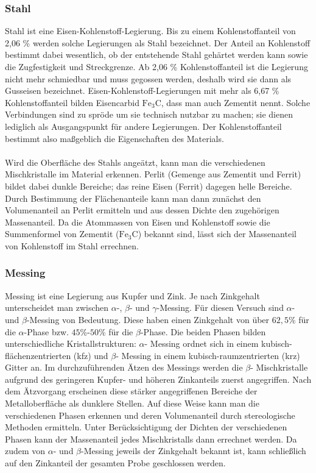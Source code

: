 \documentclass[german,  %
parskip=full,  %
]{scrartcl}
\begin{document}
\subsubsection{Stahl}
Stahl ist eine Eisen-Kohlenstoff-Legierung. Bis zu einem Kohlenstoffanteil von 2,06 \% werden solche Legierungen als Stahl bezeichnet. Der Anteil an Kohlenstoff bestimmt dabei wesentlich, ob der entstehende Stahl gehärtet werden kann sowie die Zugfestigkeit und Streckgrenze. Ab 2,06 \% Kohlenstoffanteil ist die Legierung nicht mehr schmiedbar und muss gegossen werden, deshalb wird sie dann als Gusseisen bezeichnet. Eisen-Kohlenstoff-Legierungen mit mehr als 6,67 \% Kohlenstoffanteil bilden Eisencarbid \(\mathrm{Fe}_3\mathrm{C}\), dass man auch Zementit nennt. Solche Verbindungen sind zu spröde um sie technisch nutzbar zu machen; sie dienen lediglich als Ausgangspunkt für andere Legierungen. Der Kohlenstoffanteil bestimmt also maßgeblich die Eigenschaften des Materials. \\\\
Wird die Oberfläche des Stahls angeätzt, kann man die verschiedenen Mischkristalle im Material erkennen. Perlit (Gemenge aus Zementit und Ferrit) bildet dabei dunkle Bereiche; das reine Eisen (Ferrit) dagegen helle Bereiche. Durch Bestimmung der Flächenanteile kann man dann zunächst den Volumenanteil an Perlit ermitteln und aus dessen Dichte den zugehörigen Massenanteil. Da die Atommassen von Eisen und Kohlenstoff sowie die Summenformel von Zementit (\(\mathrm{Fe}_3\mathrm{C}\)) bekannt sind, lässt sich der Massenanteil von Kohlenstoff im Stahl errechnen.



\subsubsection{Messing}
Messing ist eine Legierung aus Kupfer und Zink. Je nach Zinkgehalt unterscheidet man zwischen $\alpha$-, $\beta$- und $\gamma$-Messing. Für diesen Versuch sind  $\alpha$- und $\beta$-Messing von Bedeutung. Diese haben einen Zinkgehalt von über $62,5$\% für die \(\alpha\)-Phase bzw. $45$\%-$50$\% für die \(\beta\)-Phase. Die beiden Phasen bilden unterschiedliche Kristallstrukturen: $\alpha$- Messing ordnet sich in einem kubisch-flächenzentrierten (kfz) und $\beta$- Messing in einem kubisch-raumzentrierten (krz) Gitter an. Im durchzuführenden Ätzen des Messings werden die $\beta$- Mischkristalle aufgrund des geringeren Kupfer- und höheren Zinkanteils zuerst angegriffen. Nach dem Ätzvorgang erscheinen diese stärker angegriffenen Bereiche der Metalloberfläche als dunklere Stellen. Auf diese Weise kann man die verschiedenen Phasen erkennen und deren Volumenanteil durch stereologische Methoden ermitteln. Unter Berücksichtigung der Dichten der verschiedenen Phasen kann der Massenanteil jedes Mischkristalls dann errechnet werden. Da zudem von \(\alpha\)- und \(\beta\)-Messing jeweils der Zinkgehalt bekannt ist, kann schließlich auf den Zinkanteil der gesamten Probe geschlossen werden.
\end{document}
